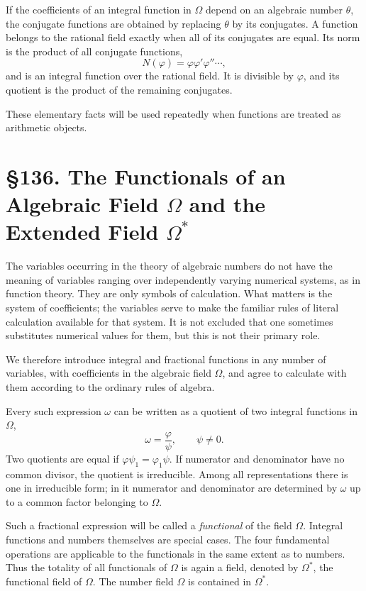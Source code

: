 \documentclass[12pt,a4paper]{article}
\newcommand{\webersection}[2]{\clearpage\section*{\S #1. #2}}
\begin{document}
If the coefficients of an integral function in \(\Omega\) depend on an algebraic number \(\theta\), the conjugate functions are obtained by replacing \(\theta\) by its conjugates.  A function belongs to the rational field exactly when all of its conjugates are equal.  Its norm is the product of all conjugate functions,
\[
 N(\varphi)=\varphi\varphi'\varphi''\cdots,
\]
and is an integral function over the rational field.  It is divisible by \(\varphi\), and its quotient is the product of the remaining conjugates.

These elementary facts will be used repeatedly when functions are treated as arithmetic objects.

\webersection{136}{The Functionals of an Algebraic Field \(\Omega\) and the Extended Field \(\Omega^*\)}

The variables occurring in the theory of algebraic numbers do not have the meaning of variables ranging over independently varying numerical systems, as in function theory.  They are only symbols of calculation.  What matters is the system of coefficients; the variables serve to make the familiar rules of literal calculation available for that system.  It is not excluded that one sometimes substitutes numerical values for them, but this is not their primary role.

We therefore introduce integral and fractional functions in any number of variables, with coefficients in the algebraic field \(\Omega\), and agree to calculate with them according to the ordinary rules of algebra.

Every such expression \(\omega\) can be written as a quotient of two integral functions in \(\Omega\),
\[
 \omega=\frac{\varphi}{\psi},
\qquad \psi\ne0.
\]
Two quotients are equal if \(\varphi\psi_1=\varphi_1\psi\).  If numerator and denominator have no common divisor, the quotient is irreducible.  Among all representations there is one in irreducible form; in it numerator and denominator are determined by \(\omega\) up to a common factor belonging to \(\Omega\).

Such a fractional expression will be called a \emph{functional} of the field \(\Omega\).  Integral functions and numbers themselves are special cases.  The four fundamental operations are applicable to the functionals in the same extent as to numbers.  Thus the totality of all functionals of \(\Omega\) is again a field, denoted by \(\Omega^*\), the functional field of \(\Omega\).  The number field \(\Omega\) is contained in \(\Omega^*\).
\end{document}
